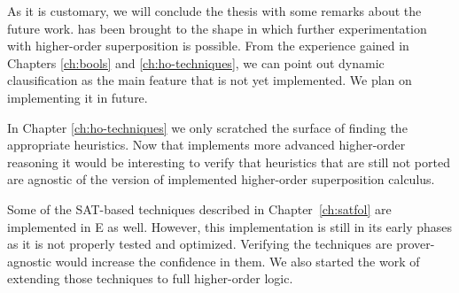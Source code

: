 As it is customary, we will conclude the thesis with some remarks about the
future work. \ehohii{} has been brought to the shape in which further
experimentation with higher-order superposition is possible. From the experience
gained in Chapters \ref{ch:bools} and \ref{ch:ho-techniques}, we can point out
dynamic clausification as the main feature that is not yet implemented. We plan
on implementing it in future.

In Chapter \ref{ch:ho-techniques} we only scratched the surface of finding the
appropriate heuristics. Now that \ehohii{} implements more advanced higher-order
reasoning it would be interesting to verify that heuristics that are still not
ported are agnostic of the version of implemented higher-order superposition
calculus. 

Some of the SAT-based techniques described in Chapter~\ref{ch:satfol} are
implemented in E as well. However, this implementation is still in its early
phases as it is not properly tested and optimized. Verifying the techniques are
prover-agnostic would increase the confidence in them. We also started the work
of extending those techniques to full higher-order logic.

